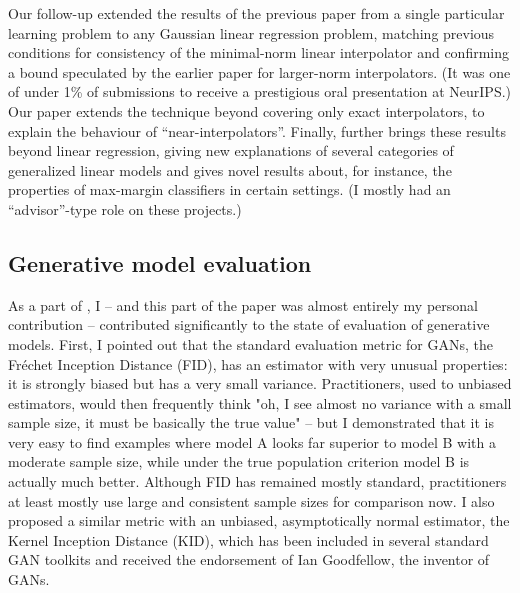 \documentclass[12pt]{article}
\begin{document}
Our follow-up \cite{koehler:gaussian-interpolators} extended the results of the previous paper from a single particular learning problem to any Gaussian linear regression problem, matching previous conditions for consistency of the minimal-norm linear interpolator and confirming a bound speculated by the earlier paper for larger-norm interpolators.
(It was one of under 1\% of submissions to receive a prestigious oral presentation at NeurIPS.)
Our paper \cite{zhou:optimistic-rates} extends the technique beyond covering only exact interpolators, to explain the behaviour of ``near-interpolators''.
Finally, \cite{zhou:moreau} further brings these results beyond linear regression,
giving new explanations of several categories of generalized linear models
and gives novel results about, for instance, the properties of max-margin classifiers in certain settings.
(I mostly had an ``advisor''-type role on these projects.)



\subsection{Generative model evaluation} \label{sec:kid}

As a part of \cite{binkowski:mmd-gans}, I – and this part of the paper was almost entirely my personal contribution – contributed significantly to the state of evaluation of generative models. First, I pointed out that the standard evaluation metric for GANs, the Fréchet Inception Distance (FID), has an estimator with very unusual properties: it is strongly biased but has a very small variance. Practitioners, used to unbiased estimators, would then frequently think "oh, I see almost no variance with a small sample size, it must be basically the true value" – but I demonstrated that it is very easy to find examples where model A looks far superior to model B with a moderate sample size, while under the true population criterion model B is actually much better. Although FID has remained mostly standard, practitioners at least mostly use large and consistent sample sizes for comparison now.
I also proposed a similar metric with an unbiased, asymptotically normal estimator, the Kernel Inception Distance (KID),
which has been included in several standard GAN toolkits
and received the endorsement of Ian Goodfellow, the inventor of GANs.
\end{document}
